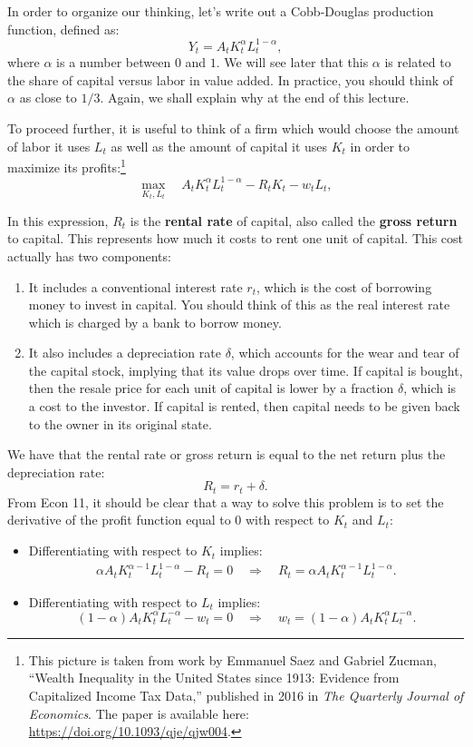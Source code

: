 \documentclass[]{book}
\providecommand{\tightlist}{%
  \setlength{\itemsep}{0pt}\setlength{\parskip}{0pt}}
\let\rmarkdownfootnote\footnote%
\def\footnote{\protect\rmarkdownfootnote}
\theoremstyle{definition}
\theoremstyle{definition}
\theoremstyle{definition}
\theoremstyle{remark}
\begin{document}
In order to organize our thinking, let's write out a Cobb-Douglas
production function, defined as:
\[Y_t = A_t K_t^{\alpha} L_t^{1-\alpha},\] where \(\alpha\) is a number
between \(0\) and \(1\). We will see later that this \(\alpha\) is
related to the share of capital versus labor in value added. In
practice, you should think of \(\alpha\) as close to \(1/3\). Again, we
shall explain why at the end of this lecture.

To proceed further, it is useful to think of a firm which would choose
the amount of labor it uses \(L_t\) as well as the amount of capital it
uses \(K_t\) in order to maximize its profits:\footnote{This picture is
  taken from work by Emmanuel Saez and Gabriel Zucman, ``Wealth
  Inequality in the United States since 1913: Evidence from Capitalized
  Income Tax Data,'' published in 2016 in \emph{The Quarterly Journal of
  Economics}. The paper is available here:
  \url{https://doi.org/10.1093/qje/qjw004}.}
\[\max_{K_t, L_t} \quad A_t K_t^{\alpha} L_t^{1-\alpha} - R_t K_t - w_t L_t,\]

In this expression, \(R_t\) is the \textbf{rental rate} of capital, also
called the \textbf{gross return} to capital. This represents how much it
costs to rent one unit of capital. This cost actually has two
components:

\begin{enumerate}
\def\labelenumi{\arabic{enumi}.}
\item
  It includes a conventional interest rate \(r_t\), which is the cost of
  borrowing money to invest in capital. You should think of this as the
  real interest rate which is charged by a bank to borrow money.
\item
  It also includes a depreciation rate \(\delta\), which accounts for
  the wear and tear of the capital stock, implying that its value drops
  over time. If capital is bought, then the resale price for each unit
  of capital is lower by a fraction \(\delta\), which is a cost to the
  investor. If capital is rented, then capital needs to be given back to
  the owner in its original state.
\end{enumerate}

We have that the rental rate or gross return is equal to the net return
plus the depreciation rate: \[\boxed{R_t = r_t + \delta}.\] From Econ
11, it should be clear that a way to solve this problem is to set the
derivative of the profit function equal to \(0\) with respect to \(K_t\)
and \(L_t\):

\begin{itemize}
\tightlist
\item
  Differentiating with respect to \(K_t\) implies: \[
  \begin{aligned}
  \alpha A_t K_t^{\alpha-1} L_t^{1-\alpha} - R_t = 0 \quad \Rightarrow \quad \boxed{R_t = \alpha A_t K_t^{\alpha-1} L_t^{1-\alpha}}.
  \end{aligned}
  \]
\item
  Differentiating with respect to \(L_t\) implies:
  \[(1-\alpha) A_t K_t^{\alpha} L_t^{-\alpha} - w_t = 0 \quad \Rightarrow \quad \boxed{w_t = (1-\alpha) A_t K_t^{\alpha} L_t^{-\alpha}}.\]
\end{itemize}
\end{document}
